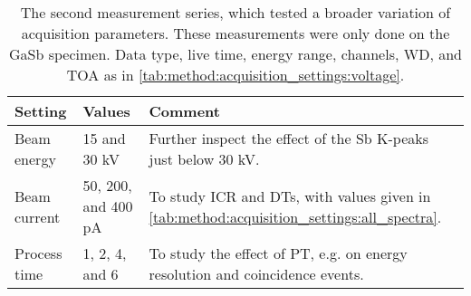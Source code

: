 \begin{table}[phtb]
    \begin{center}
        \caption{
            The second measurement series, which tested a broader variation of acquisition parameters.
            These measurements were only done on the GaSb specimen.
            Data type, live time, energy range, channels, WD, and TOA as in \cref{tab:method:acquisition_settings:voltage}.
        }
        \renewcommand*{\arraystretch}{1.2}
        \label{tab:method:acquisition_settings:other}
        \begin{tabular}{p{2cm}p{3cm}p{8.6cm}}
            \hline
            \textbf{Setting} & \textbf{Values}     & \textbf{Comment}                                                                               \\
            \hline
            Beam energy      & 15 and 30 kV        & Further inspect the effect of the Sb K-peaks just below 30 kV.                                 \\
            Beam current     & 50, 200, and 400 pA & To study ICR and DTs, with values given in \cref{tab:method:acquisition_settings:all_spectra}. \\
            Process time     & 1, 2, 4, and 6      & To study the effect of PT, e.g. on energy resolution and coincidence events.                   \\
            \hline
        \end{tabular}
    \end{center}
\end{table}
